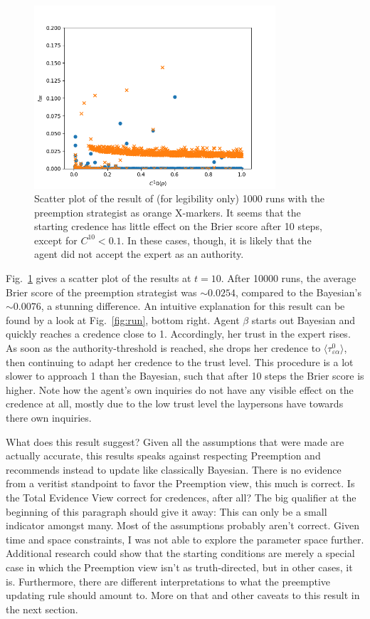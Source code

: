 \documentclass[11pt, a4paper]{scrartcl}
\renewcommand{\a}{\alpha}
\begin{document}
\begin{figure}
	\centering
\includegraphics[width=0.8\textwidth]{Result.png}
\caption{Scatter plot of the result of (for legibility only) 1000 runs with the preemption strategist as orange X-markers. It seems that the starting credence has little effect on the Brier score after 10 steps, except for $C^{10} < 0.1$. In these cases, though, it is likely that the agent did not accept the expert as an authority.\label{fig:res}}
\end{figure}

Fig.~\ref{fig:res} gives a scatter plot of the results at $t=10$. After 10000 runs, the average Brier score of the preemption strategist was $\sim0.0254$, compared to the Bayesian's $\sim0.0076$, a stunning difference. An intuitive explanation for this result can be found by a look at Fig.~\ref{fig:run}, bottom right. Agent $\beta$ starts out Bayesian and quickly reaches a credence close to 1. Accordingly, her trust in the expert rises. As soon as the authority-threshold is reached, she drops her credence to $\langle \tau^0_{\varepsilon\a} \rangle $, then continuing to adapt her credence to the trust level. This procedure is a lot slower to approach 1 than the Bayesian, such that after 10 steps the Brier score is higher. Note how the agent's own inquiries do not have any visible effect on the credence at all, mostly due to the low trust level the laypersons have towards there own inquiries.

What does this result suggest? Given all the assumptions that were made are actually accurate, this results speaks against respecting Preemption and recommends instead to update like classically Bayesian. There is no evidence from a veritist standpoint to favor the Preemption view, this much is correct. Is the Total Evidence View correct for credences, after all? The big qualifier at the beginning of this paragraph should give it away: This can only be a small indicator amongst many. Most of the assumptions probably aren't correct. Given time and space constraints, I was not able to explore the parameter space further. Additional research could show that the starting conditions are merely a special case in which the Preemption view isn't as truth-directed, but in other cases, it is. Furthermore, there are different interpretations to what the preemptive updating rule should amount to. More on that and other caveats to this result in the next section.
\end{document}
